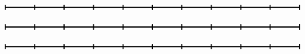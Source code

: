 \vspace{2cm}
\begin{center}
	\includegraphics[]{10}
\end{center}
\vspace{2cm}
\begin{center}
	\includegraphics[]{10}
\end{center}
\vspace{2cm}
\begin{center}
	\includegraphics[]{10}
\end{center}

